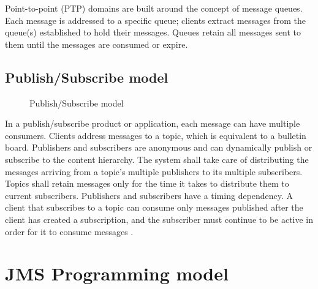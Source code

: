 \documentclass[9pt,twocolumn,twoside]{../../styles/osajnl}
\begin{document}
Point-to-point (PTP) domains are built around the concept of message
queues.  Each message is addressed to a specific queue; clients
extract messages from the queue(s) established to hold their
messages. Queues retain all messages sent to them until the messages
are consumed or expire.

\subsection{Publish/Subscribe model}

\begin{figure}[htbp]
\centering
{}
\caption{\cite{www-jms-tutorialoracle} Publish/Subscribe model}
\label{fig: Publish/Subscribe messaging}
\end{figure}

In a publish/subscribe product or application, each message can have
multiple consumers. Clients address messages to a topic, which is
equivalent to a bulletin board. Publishers and subscribers are
anonymous and can dynamically publish or subscribe to the content
hierarchy. The system shall take care of distributing the messages
arriving from a topic’s multiple publishers to its multiple
subscribers. Topics shall retain messages only for the time it takes
to distribute them to current subscribers.  Publishers and subscribers
have a timing dependency. A client that subscribes to a topic can
consume only messages published after the client has created a
subscription, and the subscriber must continue to be active in order
for it to consume messages \cite{www-jms-tutorialoracle}.


\section{JMS Programming model}
\end{document}
